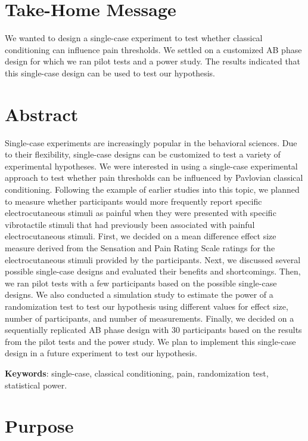 \documentclass{article}
\begin{document}
  \section{Take-Home Message} 

We wanted to design a single-case experiment to test whether classical conditioning can influence pain thresholds. We settled on a customized AB phase design for which we ran pilot tests and a power study. The results indicated that this single-case design can be used to test our hypothesis.

\section{Abstract} 

Single-case experiments are increasingly popular in the behavioral sciences. Due to their flexibility, single-case designs can be customized to test a variety of experimental hypotheses. We were interested in using a single-case experimental approach to test whether pain thresholds can be influenced by Pavlovian classical conditioning. Following the example of earlier studies into this topic, we planned to measure whether participants would more frequently report specific electrocutaneous stimuli as painful when they were presented with specific vibrotactile stimuli that had previously been associated with painful electrocutaneous stimuli. First, we decided on a mean difference effect size measure derived from the Sensation and Pain Rating Scale ratings for the electrocutaneous stimuli provided by the participants. Next, we discussed several possible single-case designs and evaluated their benefits and shortcomings. Then, we ran pilot tests with a few participants based on the possible single-case designs. We also conducted a simulation study to estimate the power of a randomization test to test our hypothesis using different values for effect size, number of participants, and number of measurements. Finally, we decided on a sequentially replicated AB phase design with 30 participants based on the results from the pilot tests and the power study. We plan to implement this single-case design in a future experiment to test our hypothesis. 

\textbf{Keywords}: single-case, classical conditioning, pain, randomization test, statistical power.

\section{Purpose} 
\end{document}
